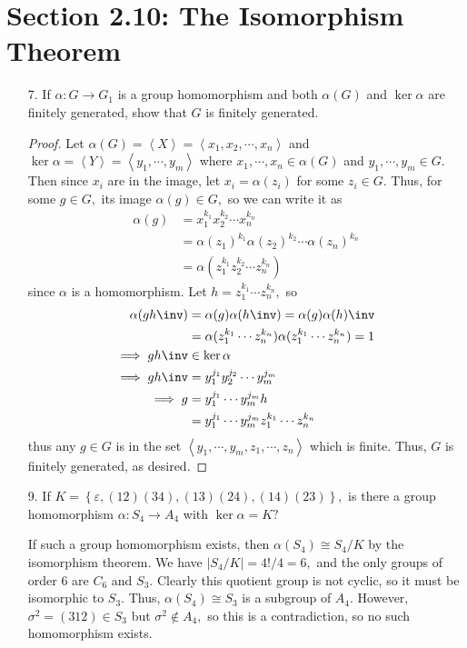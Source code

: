\documentclass{article}
\begin{document}
\section*{Section 2.10: The Isomorphism Theorem}

\begin{itemize}
	\item[7.] If $\alpha:G\to G_1$ is a group homomorphism and both $\alpha(G)$ and $\ker \alpha$ are finitely generated, show that $G$ is finitely generated.
		\begin{proof}
			Let $\alpha(G)=\left< X\right>=\left< x_1, x_2, \cdots, x_n\right>$ and $\ker \alpha=\left< Y\right>=\left< y_1, \cdots, y_m\right>$ where $x_1, \cdots, x_n\in \alpha(G)$ and $y_1, \cdots, y_m\in G.$ Then since $x_i$ are in the image, let $x_i=\alpha(z_i)$ for some $z_i\in G.$ Thus, for some $g\in G,$ its image $\alpha(g)\in G,$ so we can write it as 
			\begin{align*}
				\alpha(g) &= x_1^{k_1}x_2^{k_2}\cdots x_n^{k_n} \\
				&= \alpha(z_1)^{k_1}\alpha(z_2)^{k_2}\cdots \alpha(z_n)^{k_n} \\
				&= \alpha\left( z_1^{k_1} z_2^{k_2}\cdots z_n^{k_n} \right)
			\end{align*} since $\alpha$ is a homomorphism. Let $h=z_1^{k_1}\cdots z_n^{k_n},$ so
			\begin{align*}
				\alpha(gh\inv)&=\alpha(g)\alpha(h\inv)=\alpha(g)\alpha(h)\inv \\
				&= \alpha(z_1^{k_1}\cdots z_n^{k_n}) \alpha(z_1^{k_1}\cdots z_n^{k_n}) = 1 \\
				\implies gh\inv&\in\ker \alpha \\
				\implies gh\inv &= y_1^{j_1} y_2^{j_2}\cdots y_m^{j_m} \\
				\implies g &= y_1^{j_1} \cdots y_m^{j_m} h \\
				&= y_1^{j_1} \cdots y_m^{j_m} z_1^{k_1} \cdots z_n^{k_n}
			\end{align*} thus any $g\in G$ is in the set $\left< y_1, \cdots, y_m, z_1, \cdots, z_n\right>$ which is finite. Thus, $G$ is finitely generated, as desired.
			
		\end{proof}

	\item[9.] If $K=\left\{ \varepsilon, (12)(34), (13)(24), (14)(23) \right\},$ is there a group homomorphism $\alpha:S_4\to A_4$ with $\ker \alpha=K?$
		\begin{soln}
			If such a group homomorphism exists, then $\alpha(S_4)\cong S_4/K$ by the isomorphism theorem. We have $|S_4/K|=4!/4=6,$ and the only groups of order 6 are $C_6$ and $S_3.$ Clearly this quotient group is not cyclic, so it must be isomorphic to $S_3.$ Thus, $\alpha(S_4)\cong S_3$ is a subgroup of $A_4.$ However, $\sigma^2=(312)\in S_3$ but $\sigma^2\not\in A_4,$ so this is a contradiction, so no such homomorphism exists.
			

\end{soln}
\end{itemize}
\end{document}
